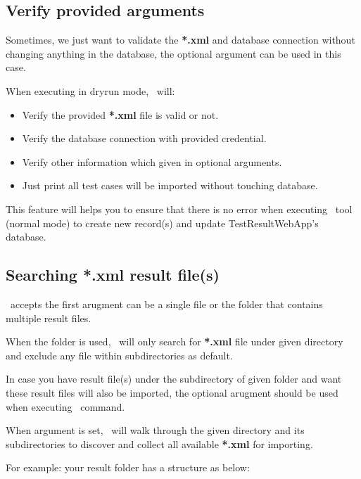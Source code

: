 \hypertarget{verify-provided-arguments}{%
\subsection{Verify provided arguments}\label{verify-provided-arguments}}

Sometimes, we just want to validate the \textbf{*.xml} and database
connection without changing anything in the database, the optional
argument  can be used in this case.

When executing in dryrun mode, \pkg\ will:

\begin{itemize}
\tightlist
\item
  Verify the provided \textbf{*.xml} file is valid or not.
\item
  Verify the database connection with provided credential.
\item
  Verify other information which given in optional arguments.
\item
  Just print all test cases will be imported without touching database.
\end{itemize}

This feature will helps you to ensure that there is no error when
executing \pkg\ tool (normal mode) to create new record(s) and
update TestResultWebApp's database.

\hypertarget{searching-.xml-result-files}{%
\subsection{Searching *.xml result file(s)}}\label{searching-.xml-result-files}

\pkg\ accepts the first arugment  can be a
single file or the folder that contains multiple result files.

When the folder is used, \pkg\ will only search for
\textbf{*.xml} file under given directory and exclude any file within
subdirectories as default.

In case you have result file(s) under the subdirectory of given folder
and want these result files will also be imported, the optional arugment
 should be used when executing \pkg\ command.

When  argument is set, \pkg\ will walk
through the given directory and its subdirectories to discover and
collect all available \textbf{*.xml} for importing.

For example: your result folder has a structure as below:

